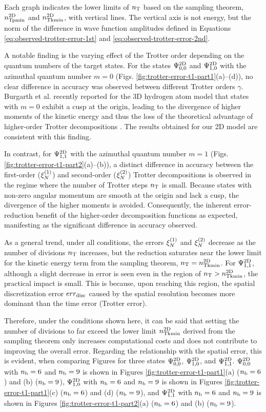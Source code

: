 \documentclass[jctc-draft.tex]{subfiles}
\begin{document}
Each graph indicates the lower limits of $n_{\mathrm{T}}$ based on the sampling theorem,
$n_{\mathrm{Tpmin}}^{\mathrm{2D}}$ and $n_{\mathrm{Tkmin}}^{\mathrm{2D}}$, with vertical lines. The vertical axis is not
energy, but the norm of the difference in wave function amplitudes defined in
Equations \eqref{eq:observed-trotter-error-1st} and
\eqref{eq:observed-trotter-error-2nd}.

A notable finding is the varying effect of the Trotter order depending on the
quantum numbers of the target states. For the states $\Psi^{\mathrm{2D}}_{0,0}$ and
$\Psi^{\mathrm{2D}}_{1,0}$ with the azimuthal quantum number $m=0$ (Figs.
\ref{fig:trotter-error-t1-part1}(a)--(d)), no clear difference in accuracy was
observed between different Trotter orders $\gamma$. Burgarth et al. recently
reported for the 3D hydrogen atom model that states with $m=0$ exhibit a cusp at
the origin, leading to the divergence of higher moments of the kinetic energy
and thus the loss of the theoretical advantage of higher-order Trotter
decompositions \cite{Burgarth2024.PhysRevResearch.6.043155}. The results
obtained for our 2D model are consistent with this finding.

In contrast, for $\Psi^{\mathrm{2D}}_{1,1}$ with the azimuthal quantum number $m=1$ (Figs.
\ref{fig:trotter-error-t1-part2}(a)--(b)), a distinct difference in accuracy
between the first-order ($\xi_{N}^{(1)}$) and second-order ($\xi_{N}^{(2)}$) Trotter
decompositions is observed in the regime where the number of Trotter steps $n_{\mathrm{T}}$
is small. Because states with non-zero angular momentum are smooth at the origin
and lack a cusp, the divergence of the higher moments is avoided. Consequently,
the inherent error-reduction benefit of the higher-order decomposition functions
as expected, manifesting as the significant difference in accuracy observed.

As a general trend, under all conditions, the errors $\xi_{N}^{(1)}$ and $\xi_{N}^{(2)}$
decrease as the number of divisions $n_{\mathrm{T}}$ increases, but the reduction saturates
near the lower limit for the kinetic energy term from the sampling theorem, $n_{\mathrm{T}}
= n_{\mathrm{Tkmin}}^{\mathrm{2D}}$. For $\Psi^{\mathrm{2D}}_{1,1}$, although a slight decrease in error is
seen even in the region of $n_{\mathrm{T}} > n_{\mathrm{Tkmin}}^{\mathrm{2D}}$, the practical impact is small.
This is because, upon reaching this region, the spatial discretization error
$err_{\mathrm{disc}}$ caused by the spatial resolution becomes more dominant than the time
error (Trotter error).

Therefore, under the conditions shown here, it can be said that setting the
number of divisions to far exceed the lower limit $n_{\mathrm{Tkmin}}^{\mathrm{2D}}$ derived from the
sampling theorem only increases computational costs and does not contribute to
improving the overall error. Regarding the relationship with the spatial error,
this is evident, when comparing Figures for three states $\Psi^{\mathrm{2D}}_{0,0}$,
$\Psi^{\mathrm{2D}}_{1,0}$, and $\Psi^{\mathrm{2D}}_{1,1}$. $\Psi^{\mathrm{2D}}_{0,0}$ with $n_{\mathrm{b}}=6$ and
$n_{\mathrm{b}}=9$ is shown in Figures \ref{fig:trotter-error-t1-part1}(a) ($n_{\mathrm{b}}=6$) and
(b) ($n_{\mathrm{b}}=9$), $\Psi^{\mathrm{2D}}_{1,0}$ with $n_{\mathrm{b}}=6$ and $n_{\mathrm{b}}=9$ is shown in Figures
\ref{fig:trotter-error-t1-part1}(c) ($n_{\mathrm{b}}=6$) and (d) ($n_{\mathrm{b}}=9$), and
$\Psi^{\mathrm{2D}}_{1,1}$ with $n_{\mathrm{b}}=6$ and $n_{\mathrm{b}}=9$ is shown in Figures
\ref{fig:trotter-error-t1-part2}(a) ($n_{\mathrm{b}}=6$) and (b) ($n_{\mathrm{b}}=9$).
\end{document}
